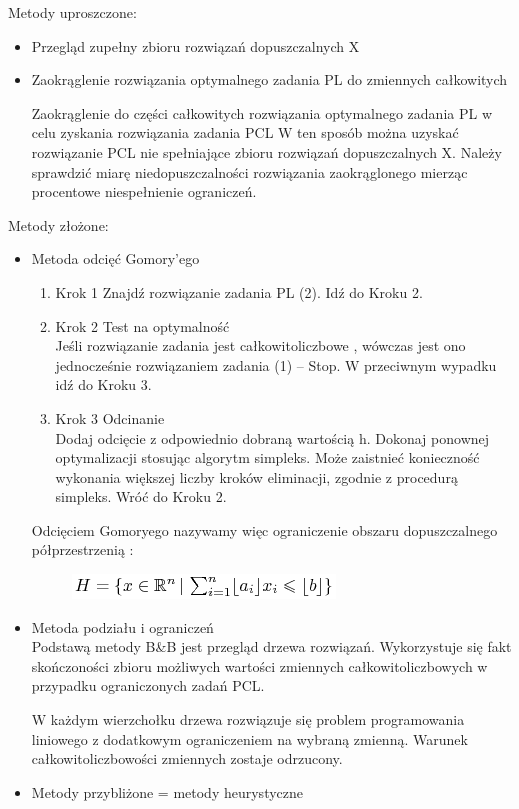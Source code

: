 \documentclass[a4paper,twoside]{report}
\begin{document}
		Metody uproszczone:
		\begin{itemize}
			\item Przegląd zupełny zbioru rozwiązań dopuszczalnych X
			\item Zaokrąglenie rozwiązania optymalnego zadania PL do zmiennych całkowitych
			
			Zaokrąglenie do części całkowitych rozwiązania optymalnego zadania PL w 
			celu zyskania rozwiązania zadania PCL
			W ten sposób można uzyskać rozwiązanie PCL nie spełniające zbioru 
			rozwiązań dopuszczalnych X.
			Należy sprawdzić miarę niedopuszczalności rozwiązania zaokrąglonego 
			mierząc procentowe niespełnienie ograniczeń.
		\end{itemize}
		
		Metody złożone:
		\begin{itemize}
			\item Metoda odcięć Gomory'ego
			
			\begin{enumerate}
				\item Krok 1
				Znajdź rozwiązanie zadania PL  (2). Idź do Kroku 2.
				\item Krok 2
				Test na optymalność\\
				Jeśli rozwiązanie zadania jest całkowitoliczbowe , 
				wówczas jest ono 
				jednocześnie rozwiązaniem zadania (1) – Stop. 
				W przeciwnym wypadku idź do Kroku 3.
				\item Krok 3
				Odcinanie \\
				Dodaj odcięcie z odpowiednio dobraną wartością h. Dokonaj ponownej optymalizacji stosując algorytm simpleks. Może zaistnieć konieczność wykonania większej liczby kroków eliminacji, zgodnie z procedurą simpleks. 
				Wróć do Kroku 2.
			\end{enumerate}
			
			Odcięciem Gomoryego nazywamy więc ograniczenie obszaru dopuszczalnego półprzestrzenią :
			
			\begin{figure}[H]
				\includegraphics[scale=1
				]{obrazy/optymalizacja/opt6.png}
			\end{figure} 
			
			
			\item Metoda podziału i ograniczeń \\
			Podstawą metody B\&B jest przegląd drzewa rozwiązań.
			Wykorzystuje się fakt skończoności zbioru możliwych 
			wartości 
			zmiennych całkowitoliczbowych w przypadku ograniczonych zadań
			PCL.
			
			W każdym wierzchołku drzewa rozwiązuje się problem programowania 
			liniowego z dodatkowym ograniczeniem na wybraną zmienną. 
			Warunek całkowitoliczbowości zmiennych zostaje odrzucony.
			\item Metody przybliżone = metody heurystyczne
		\end{itemize}
		
\end{document}
